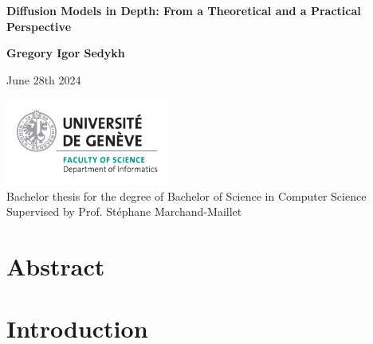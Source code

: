 \documentclass{article}
\begin{document}
\begin{titlepage}
  \begin{center}
      \vspace*{1cm}

      \LARGE
      \textbf{Diffusion Models in Depth: From a Theoretical and a Practical Perspective}

      \vspace{1.5cm}

      \Large
      \textbf{Gregory Igor Sedykh}
      \vspace{0.8cm}

      \normalsize
      June 28th 2024

      \vfill

      \includegraphics[width=0.4\textwidth]{images/informatics_en.png} \\

      Bachelor thesis for the degree of Bachelor of Science in Computer Science \\
      Supervised by Prof. Stéphane Marchand-Maillet     

      \vspace{0.8cm}
    
           
           
  \end{center}
\end{titlepage}

\newpage
\section*{Abstract}

\newpage
\tableofcontents



\newpage
\section{Introduction}
\end{document}
